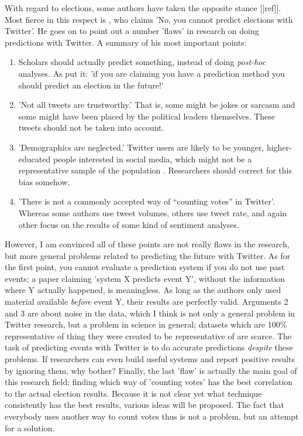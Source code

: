 \documentclass[12pt]{article}
\begin{document}
With regard to elections, some authors have taken the opposite stance [[ref]]. Most fierce in this respect is , who claims 'No, you cannot predict elections with Twitter'. He goes on to point out a number 'flaws' in research on doing predictions with Twitter. A summary of his most important points:

\begin{enumerate}
\item Scholars should actually predict something, instead of doing \emph{post-hoc} analyses. As  put it: 'if you are claiming you have a prediction method you should predict an election in the future!'
\item 'Not all tweets are trustworthy.' That is, some might be jokes or sarcasm and some might have been placed by the political leaders themselves. These tweets should not be taken into account.
\item 'Demographics are neglected.' Twitter users are likely to be younger, higher-educated people interested in social media, which might not be a representative sample of the population . Researchers should correct for this bias somehow.
\item 'There is not a commonly accepted way of “counting votes” in Twitter'. Whereas some authors use tweet volumes, others use tweet rate, and again other focus on the results of some kind of sentiment analyses.
\end{enumerate}

However, I am convinced all of these points are not really flaws in the research, but more general problems related to predicting the future with Twitter. As for the first point, you cannot evaluate a prediction system if you do not use past events; a paper claiming 'system X predicts event Y', without the information where Y actually happened, is meaningless. As long as the authors only used material available \emph{before} event Y, their results are perfectly valid. Arguments 2 and 3 are about noise in the data, which I think is not only a general problem in Twitter research, but a problem in science in general; datasets which are 100\% representative of thing they were created to be representative of are scarce. The task of predicting events with Twitter is to do accurate predictions \emph{despite} these problems. If researchers can even build useful systems and report positive results by ignoring them, why bother? Finally, the last 'flaw' is actually the main goal of this research field: finding which way of 'counting votes' has the best correlation to the actual election results. Because it is not clear yet what technique consistently has the best results, various ideas will be proposed. The fact that everybody uses another way to count votes thus is not a problem, but an attempt for a solution.
\end{document}
